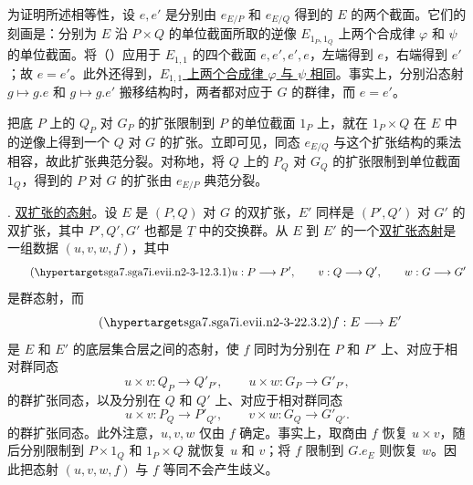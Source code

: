 
为证明所述相等性，设 $e,e'$ 是分别由 $e_{E/P}$ 和 $e_{E/Q}$ 得到的 $E$ 的两个截面。它们的刻画是：分别为 $E$ 沿 $P\times Q$ 的单位截面所取的逆像 $E_{1_P,1_Q}$ 上两个合成律 $\varphi$ 和 $\psi$ 的单位截面。将（）应用于 $E_{1,1}$ 的四个截面 $e,e',e',e$，左端得到 $e$，右端得到 $e'$；故 $e=e'$。此外还得到，\underline{$E_{1,1}$ 上两个合成律 $\varphi$ 与 $\psi$ 相同}。事实上，分别沿态射 $g\mapsto g.e$ 和 $g\mapsto g.e'$ 搬移结构时，两者都对应于 $G$ 的群律，而 $e=e'$。

把底 $P$ 上的 $Q_P$ 对 $G_P$ 的扩张限制到 $P$ 的单位截面 $1_P$ 上，就在 $1_P\times Q$ 在 $E$ 中的逆像上得到一个 $Q$ 对 $G$ 的扩张。立即可见，同态 $e_{E/Q}$ 与这个扩张结构的乘法相容，故此扩张典范分裂。对称地，将 $Q$ 上的 $P_Q$ 对 $G_Q$ 的扩张限制到单位截面 $1_Q$，得到的 $P$ 对 $G$ 的扩张由 $e_{E/P}$ 典范分裂。




. \underline{双扩张的态射}。设 $E$ 是 $(P,Q)$ 对 $G$ 的双扩张，$E'$ 同样是 $(P',Q')$ 对 $G'$ 的双扩张，其中 $P',Q',G'$ 也都是 $\underline T$ 中的交换群。从 $E$ 到 $E'$ 的一个\underline{双扩张态射}是一组数据 $(u,v,w,f)$，其中
\begin{equation}\tag{\SGARefTarget{sga7.sga7i.evii.n2-3-1}{2.3.1}}
 u:P\longrightarrow P',\qquad
 v:Q\longrightarrow Q',\qquad
 w:G\longrightarrow G'
\end{equation}
是群态射，而
\begin{equation}\tag{\SGARefTarget{sga7.sga7i.evii.n2-3-2}{2.3.2}}
 f:E\longrightarrow E'
\end{equation}
是 $E$ 和 $E'$ 的底层集合层之间的态射，使 $f$ 同时为分别在 $P$ 和 $P'$ 上、对应于相对群同态
\[
 u\times v:Q_P\longrightarrow Q'_{P'},
 \qquad
 u\times w:G_P\longrightarrow G'_{P'},
\]
的群扩张同态，以及分别在 $Q$ 和 $Q'$ 上、对应于相对群同态
\[
 u\times v:P_Q\longrightarrow P'_{Q'},
 \qquad
 v\times w:G_Q\longrightarrow G'_{Q'}.
\]
的群扩张同态。此外注意，$u,v,w$ 仅由 $f$ 确定。事实上，取商由 $f$ 恢复 $u\times v$，随后分别限制到 $P\times1_Q$ 和 $1_P\times Q$ 就恢复 $u$ 和 $v$；将 $f$ 限制到 $G.e_E$ 则恢复 $w$。因此把态射 $(u,v,w,f)$ 与 $f$ 等同不会产生歧义。


